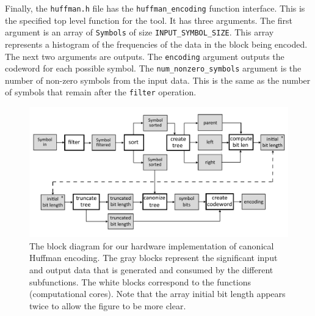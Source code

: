 Finally, the \lstinline{huffman.h} file has the \lstinline{huffman_encoding} function interface. This is the specified top level function for the \VHLS tool. It has three arguments. The first argument is an array of \lstinline{Symbols} of size \lstinline{INPUT_SYMBOL_SIZE}.  This array represents a histogram of the frequencies of the data in the block being encoded. The next two arguments are outputs. The \lstinline{encoding} argument outputs the codeword for each possible symbol. The \lstinline{num_nonzero_symbols} argument is the number of non-zero symbols from the input data. This is the same as the number of symbols that remain after the \lstinline{filter} operation. 

\begin{figure}
\centering
\includegraphics[width= \textwidth]{images/che_dataflow}
\caption{ The block diagram for our hardware implementation of canonical Huffman encoding. The gray blocks represent the significant input and output data that is generated and consumed by the different subfunctions. The white blocks correspond to the functions (computational cores). Note that the array initial bit length appears twice to allow the figure to be more clear.}
\label{fig:che_dataflow}
\end{figure}

